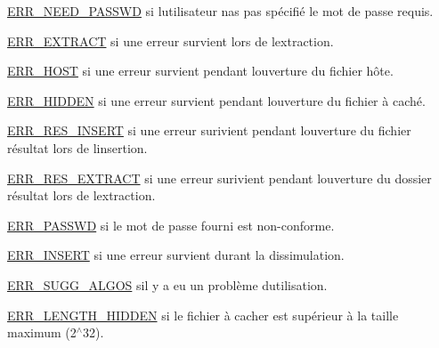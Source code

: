 \begin{DoxyRefList}
\hyperlink{a00011_a08b18ac8af0f3462354240d9732f3852a0639f3719d0bf22c36b5ca1711fe3d7e}{E\+R\+R\+\_\+\+N\+E\+E\+D\+\_\+\+P\+A\+S\+S\+WD} si l\textquotesingle{}utilisateur n\textquotesingle{}as pas spécifié le mot de passe requis.  
\item[\label{a00134__errors000007}%
\Hypertarget{a00134__errors000007}%
Global(e) \hyperlink{a00065_a43c63dd958bfa1f4ab2ecbd7faa14abb}{stegx\+\_\+extract} (info\+\_\+s $\ast$infos, char $\ast$res\+\_\+path)]\hyperlink{a00011_a08b18ac8af0f3462354240d9732f3852aad3e8c13adfc55ea1cd105e92972dd33}{E\+R\+R\+\_\+\+E\+X\+T\+R\+A\+CT} si une erreur survient lors de l\textquotesingle{}extraction.  
\item[\label{a00134__errors000001}%
\Hypertarget{a00134__errors000001}%
Global(e) \hyperlink{a00107_ab6aa5e9de0fc83d5dc066f032c75c51b}{stegx\+\_\+init} (stegx\+\_\+choices\+\_\+s $\ast$choices)]\hyperlink{a00011_a08b18ac8af0f3462354240d9732f3852a49b4659ab34e5808bae4b43669ae5689}{E\+R\+R\+\_\+\+H\+O\+ST} si une erreur survient pendant l\textquotesingle{}ouverture du fichier hôte. 

\hyperlink{a00011_a08b18ac8af0f3462354240d9732f3852af09332ce4e53766f2a7c538727b1f672}{E\+R\+R\+\_\+\+H\+I\+D\+D\+EN} si une erreur survient pendant l\textquotesingle{}ouverture du fichier à caché. 

\hyperlink{a00011_a08b18ac8af0f3462354240d9732f3852a7a60287832ac640af50a1e4d0bb5a7bf}{E\+R\+R\+\_\+\+R\+E\+S\+\_\+\+I\+N\+S\+E\+RT} si une erreur surivient pendant l\textquotesingle{}ouverture du fichier résultat lors de l\textquotesingle{}insertion. 

\hyperlink{a00011_a08b18ac8af0f3462354240d9732f3852ae9b69ff89121ced90b1ad58869cfbf6c}{E\+R\+R\+\_\+\+R\+E\+S\+\_\+\+E\+X\+T\+R\+A\+CT} si une erreur surivient pendant l\textquotesingle{}ouverture du dossier résultat lors de l\textquotesingle{}extraction. 

\hyperlink{a00011_a08b18ac8af0f3462354240d9732f3852a4d17c66e1810646c6f6fef5e30f8904e}{E\+R\+R\+\_\+\+P\+A\+S\+S\+WD} si le mot de passe fourni est non-\/conforme.  
\item[\label{a00134__errors000006}%
\Hypertarget{a00134__errors000006}%
Global(e) \hyperlink{a00110_a45a1d0709604d55e9d467cb39d6a5b54}{stegx\+\_\+insert} (info\+\_\+s $\ast$infos)]\hyperlink{a00011_a08b18ac8af0f3462354240d9732f3852a103888724a059b8ab2855577bd73e8b8}{E\+R\+R\+\_\+\+I\+N\+S\+E\+RT} si une erreur survient durant la dissimulation.  
\item[\label{a00134__errors000003}%
\Hypertarget{a00134__errors000003}%
Global(e) \hyperlink{a00128_adc277622e5fe0d1814be76f11263b350}{stegx\+\_\+suggest\+\_\+algo} (info\+\_\+s $\ast$infos)]\hyperlink{a00011_a08b18ac8af0f3462354240d9732f3852a72cfc98feeed9df5050bd2b25d2d28c2}{E\+R\+R\+\_\+\+S\+U\+G\+G\+\_\+\+A\+L\+G\+OS} s\textquotesingle{}il y a eu un problème d\textquotesingle{}utilisation. 

\hyperlink{a00011_a08b18ac8af0f3462354240d9732f3852ae149fbd002acad554baf6a5abbc08c12}{E\+R\+R\+\_\+\+L\+E\+N\+G\+T\+H\+\_\+\+H\+I\+D\+D\+EN} si le fichier à cacher est supérieur à la taille maximum (2$^\wedge$32). 
\end{DoxyRefList}